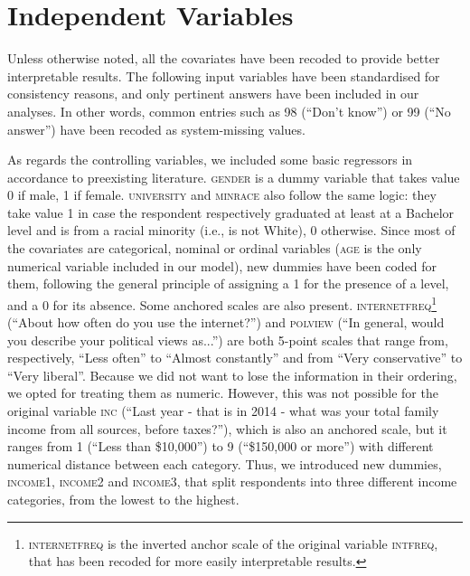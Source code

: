 \section{Independent Variables}

Unless otherwise noted, all the covariates have been recoded to provide
better interpretable results. The following input variables have been
standardised for consistency reasons, and only pertinent answers have
been included in our analyses. In other words, common entries such
as 98 (\textquotedblleft Don\textquoteright t know\textquotedblright )
or 99 (\textquotedblleft No answer\textquotedblright ) have been recoded
as system-missing values.

As regards the controlling variables, we included some basic regressors
in accordance to preexisting literature. \textsc{gender} is a dummy
variable that takes value 0 if male, 1 if female. \textsc{university}
and \textsc{minrace} also follow the same logic: they take value 1
in case the respondent \textendash{} respectively \textendash{} graduated
at least at a Bachelor level and is from a racial minority (i.e.,
is not White), 0 otherwise. Since most of the covariates are categorical,
nominal or ordinal variables (\textsc{age} is the only numerical variable
included in our model), new dummies have been coded for them, following
the general principle of assigning a 1 for the presence of a level,
and a 0 for its absence. Some anchored scales are also present. \textsc{internetfreq}\footnote{\textsc{internetfreq} is the inverted anchor scale of the original
variable \textsc{intfreq}, that has been recoded for more easily interpretable
results.} (\textquotedblleft About how often do you use the internet?\textquotedblright )
and \textsc{polview} (\textquotedblleft In general, would you describe
your political views as...\textquotedblright ) are both 5-point scales
that range from, respectively, \textquotedblleft Less often\textquotedblright{}
to \textquotedblleft Almost constantly\textquotedblright{} and from
\textquotedblleft Very conservative\textquotedblright{} to \textquotedblleft Very
liberal\textquotedblright . Because we did not want to lose the information
in their ordering, we opted for treating them as numeric. However,
this was not possible for the original variable \textsc{inc} (\textquotedblleft Last
year - that is in 2014 - what was your total family income from all
sources, before taxes?\textquotedblright ), which is also an anchored
scale, but it ranges from 1 (\textquotedblleft Less than \$10,000\textquotedblright )
to 9 (\textquotedblleft \$150,000 or more\textquotedblright ) with
different numerical distance between each category. Thus, we introduced
new dummies, \textsc{income1}, \textsc{income2} and \textsc{income3},
that split respondents into three different income categories, from
the lowest to the highest. 

